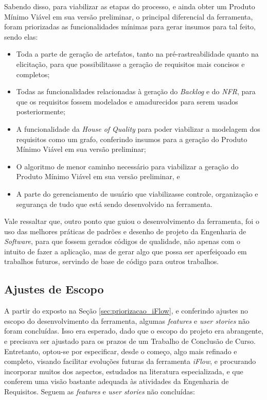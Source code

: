 Sabendo disso, para viabilizar as etapas do processo, e ainda obter um Produto Mínimo Viável em sua versão preliminar, o principal diferencial da ferramenta, foram priorizadas as funcionalidades mínimas para gerar insumos para tal feito, sendo elas:

\begin{itemize}
    \item Toda a parte de geração de artefatos, tanto na pré-rastreabilidade quanto na elicitação, para que possibilitasse a geração de requisitos mais concisos e completos;
    \item Todas as funcionalidades relacionadas à geração do \textit{Backlog} e do \textit{NFR}, para que os requisitos fossem modelados e amadurecidos para serem usados posteriormente;
    \item A funcionalidade da \textit{House of Quality} para poder viabilizar a modelagem dos requisitos como um grafo, conferindo insumos para a geração do Produto Mínimo Viável em sua versão preliminar;
    \item O algoritmo de menor caminho necessário para viabilizar a geração do Produto Mínimo Viável em sua versão preliminar, e
    \item A parte do gerenciamento de usuário que viabilizasse controle, organização e segurança de tudo que está sendo desenvolvido na ferramenta.
\end{itemize}

Vale ressaltar que, outro ponto que guiou o desenvolvimento da ferramenta, foi o uso das melhores práticas de padrões e desenho de projeto da Engenharia de \textit{Software}, para que fossem gerados códigos de qualidade, não apenas com o intuito de fazer a aplicação, mas de gerar algo que possa ser aperfeiçoado em trabalhos futuros, servindo de base de código para outros trabalhos.

\subsection{Ajustes de Escopo}
\label{sub:corte_de_escopo}

A partir do exposto na Seção \ref{sec:priorizacao_iFlow}, e conferindo ajustes no escopo do desenvolvimento da ferramenta, algumas \textit{features} e \textit{user stories} não foram concluídas. Isso era esperado, dado que o escopo do projeto era abrangente, e precisava ser ajustado para os prazos de um Trabalho de Conclusão de Curso. Entretanto, optou-se por especificar, desde o começo, algo mais refinado e completo, visando facilitar evoluções futuras da ferramenta \textit{iFlow}, e procurando incorporar muitos dos aspectos, estudados na literatura especializada, e que conferem uma visão bastante adequada às atividades da Engenharia de Requisitos. Seguem as \textit{features} e \textit{user stories} não concluídas:

